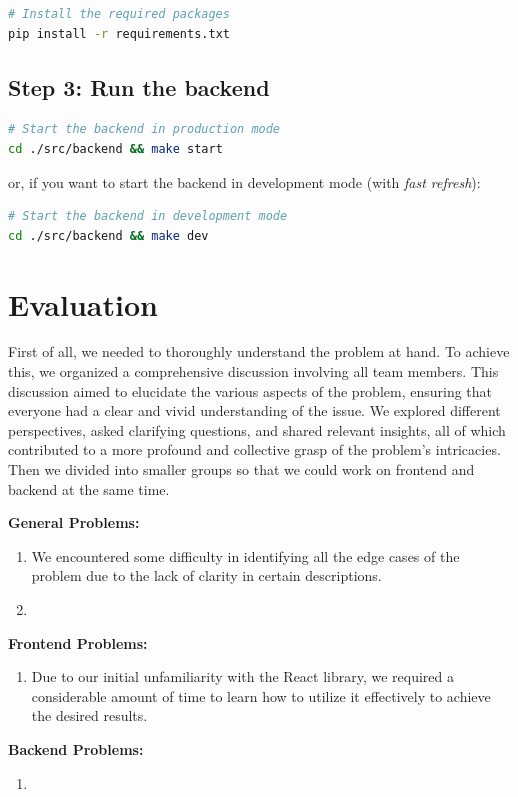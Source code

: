 \documentclass[a4paper, 11pt]{article}
\begin{document}
\begin{lstlisting}[language=bash]
# Install the required packages
pip install -r requirements.txt
\end{lstlisting}

\subsection{Step 3: Run the backend}

\begin{lstlisting}[language=bash]
# Start the backend in production mode
cd ./src/backend && make start
\end{lstlisting}

or, if you want to start the backend in development mode (with \textit{fast refresh}):

\begin{lstlisting}[language=bash]
# Start the backend in development mode
cd ./src/backend && make dev
\end{lstlisting}

\pagebreak

\section{Evaluation}

First of all, we needed to thoroughly understand the problem at hand. To achieve this, we organized a comprehensive discussion involving all team members. This discussion aimed to elucidate the various aspects of the problem, ensuring that everyone had a clear and vivid understanding of the issue. We explored different perspectives, asked clarifying questions, and shared relevant insights, all of which contributed to a more profound and collective grasp of the problem's intricacies. Then we divided into smaller groups so that we could work on frontend and backend at the same time.

\textbf{General Problems:}

\begin{enumerate}
    \item We encountered some difficulty in identifying all the edge cases of the problem due to the lack of clarity in certain descriptions.
    \item 
\end{enumerate}

\textbf{Frontend Problems:}

\begin{enumerate}
    \item Due to our initial unfamiliarity with the React library, we required a considerable amount of time to learn how to utilize it effectively to achieve the desired results.
\end{enumerate}

\textbf{Backend Problems:}

\begin{enumerate}
    \item 
\end{enumerate}
\end{document}
